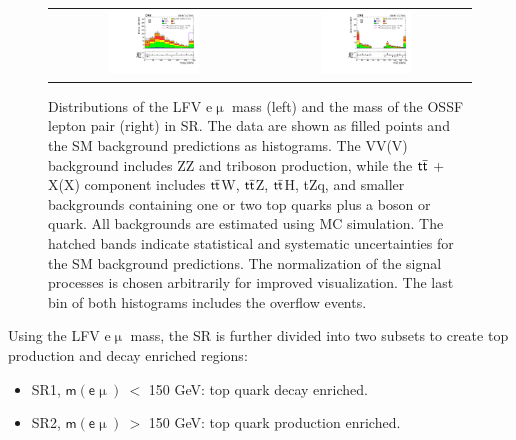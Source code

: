 \begin{figure}[tbh!]
 \begin{center}
 \begin{tabular}{cc}
 \includegraphics[width=0.45\textwidth]{figures/Part3/Selection/Memu}&
 \includegraphics[width=0.45\textwidth]{figures/Part3/Selection/Zmass} \\
 \end{tabular}
 \caption{Distributions of the LFV e$\upmu$ mass (left) and the mass of the \ac{OSSF} lepton pair (right) in \ac{SR}. The data are shown as filled points and the \ac{SM} background predictions as histograms. The VV(V) background includes ZZ and triboson production, while the $\textsf{t}\overline{\textsf{t}}$ + X(X) component includes $\textsf{t}\overline{\textsf{t}}$W, $\textsf{t}\overline{\textsf{t}}$Z, $\textsf{t}\overline{\textsf{t}}$H, tZq, and smaller backgrounds containing one or two top quarks plus a boson or quark. All backgrounds are estimated using \ac{MC} simulation. The hatched bands indicate statistical and systematic uncertainties for the \ac{SM} background predictions. The normalization of the signal processes is chosen arbitrarily for improved visualization. The last bin of both histograms includes the overflow events.}
 \label{fig:SR}
 \end{center}
\end{figure}

Using the LFV e$\upmu$ mass, the \ac{SR} is further divided into two subsets to create top production and decay enriched regions:

\begin{itemize}
\item SR1, $\textsf{m}(\textsf{e}\upmu)~<$ 150 GeV: top quark decay enriched.
\item SR2, $\textsf{m}(\textsf{e}\upmu)~>$ 150 GeV: top quark production enriched.
\end{itemize}
